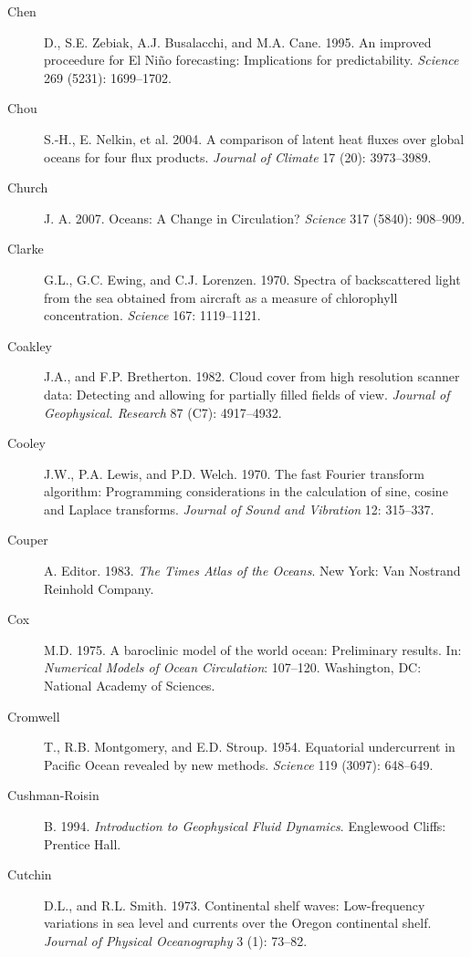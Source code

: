 \begin{description}
\item [Chen]D., S.E. Zebiak, A.J. Busalacchi, and M.A. Cane. 1995. An
improved proceedure for El Ni\~{n}o forecasting: Implications for predictability.
\textit{Science} 269 (5231): 1699--1702.

\item [Chou]S.-H., E. Nelkin, et al. 2004. A comparison of latent heat fluxes over global oceans for four flux products. \textit{Journal of Climate} 17 (20): 3973--3989.

\item [Church]J. A. 2007. Oceans: A Change in Circulation? \textit{Science} 317 (5840): 908--909.
	
\item [Clarke]G.L., G.C. Ewing, and C.J. Lorenzen. 1970. Spectra of
backscattered light from the sea obtained from aircraft as a measure of
chlorophyll concentration. \textit{Science} 167: 1119--1121.

\item [Coakley]J.A., and F.P. Bretherton. 1982. Cloud cover from high
resolution scanner data: Detecting and allowing for partially filled fields of
view. \textit{Journal of Geophysical. Research} 87 (C7): 4917--4932.

\item [Cooley]J.W., P.A. Lewis, and P.D. Welch. 1970. The fast Fourier
transform algorithm: Programming considerations in the calculation of sine,
cosine and Laplace transforms. \textit{Journal of Sound and Vibration} 12:
315--337.

\item [Couper]A. Editor. 1983. \textit{The Times Atlas of the Oceans}. New York:
Van Nostrand Reinhold Company.

\item [Cox]M.D. 1975. A baroclinic model of the world ocean: Preliminary
results. In: \textit{Numerical Models of Ocean Circulation}: 107--120. Washington,
DC: National Academy of Sciences.

\item [Cromwell]T., R.B. Montgomery, and E.D. Stroup. 1954. Equatorial
undercurrent in Pacific Ocean revealed by new methods. \textit{Science} 119
(3097): 648--649.

\item[Cushman-Roisin]B. 1994. \textit{Introduction to Geophysical Fluid
Dynamics}.  Englewood Cliffs: Prentice Hall.

\item[Cutchin]D.L., and R.L. Smith. 1973. Continental shelf waves:
Low-frequency variations in sea level and currents over the Oregon continental
shelf. \textit{Journal of Physical Oceanography} 3 (1): 73--82.


\end{description}
